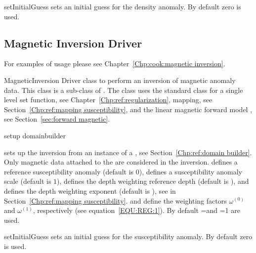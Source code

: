 \begin{methoddesc}[GravityInversion]{setInitialGuess}{}
sets an initial guess for the density anomaly. By default zero is used.
\end{methoddesc}

\subsection{Magnetic Inversion Driver}
For examples of usage please see Chapter~\ref{Chp:cook:magnetic inversion}.

\begin{classdesc}{MagneticInversion}{}
Driver class to perform an inversion of magnetic anomaly data. This class
is a sub-class of . The class uses the standard
 class for a single level set function, see Chapter~\ref{Chp:ref:regularization},
 mapping, see Section~\ref{Chp:ref:mapping susceptibility}, and the linear
magnetic forward model , see Section~\ref{sec:forward magnetic}.
\end{classdesc}


\begin{methoddesc}[MagneticInversion]{setup}{
domainbuilder
}

sets up the inversion from an instance  of a , see Section~\ref{Chp:ref:domain builder}.
Only magnetic data attached to the  are considered in the inversion.
 defines a reference susceptibility anomaly (default is $0$), 
 defines a susceptibility anomaly scale (default is $1$),
 defines the depth weighting reference depth (default is \None), and
 defines the depth weighting exponent (default is \None),
see  in Section~\ref{Chp:ref:mapping susceptibility}.
 and  define the weighting factors
$\omega^{(0)}$ and
$\omega^{(1)}$, respectively (see equation~\ref{EQU:REG:1}).
By default =\None and =1 are used.
\end{methoddesc}

\begin{methoddesc}[MagneticInversion]{setInitialGuess}{}
sets an initial guess for the susceptibility anomaly. By default zero is used.
\end{methoddesc}

